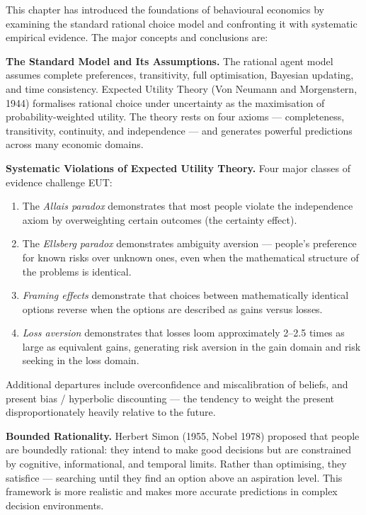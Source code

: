 \documentclass[12pt, letterpaper]{article}
\begin{document}
This chapter has introduced the foundations of behavioural economics by examining the standard rational choice model and confronting it with systematic empirical evidence. The major concepts and conclusions are:

\textbf{The Standard Model and Its Assumptions.} The rational agent model assumes complete preferences, transitivity, full optimisation, Bayesian updating, and time consistency. Expected Utility Theory (Von Neumann and Morgenstern, 1944) formalises rational choice under uncertainty as the maximisation of probability-weighted utility. The theory rests on four axioms --- completeness, transitivity, continuity, and independence --- and generates powerful predictions across many economic domains.

\textbf{Systematic Violations of Expected Utility Theory.} Four major classes of evidence challenge EUT:
\begin{enumerate}
\item The \textit{Allais paradox} demonstrates that most people violate the independence axiom by overweighting certain outcomes (the certainty effect).
\item The \textit{Ellsberg paradox} demonstrates ambiguity aversion --- people's preference for known risks over unknown ones, even when the mathematical structure of the problems is identical.
\item \textit{Framing effects} demonstrate that choices between mathematically identical options reverse when the options are described as gains versus losses.
\item \textit{Loss aversion} demonstrates that losses loom approximately 2--2.5 times as large as equivalent gains, generating risk aversion in the gain domain and risk seeking in the loss domain.
\end{enumerate}

Additional departures include overconfidence and miscalibration of beliefs, and present bias / hyperbolic discounting --- the tendency to weight the present disproportionately heavily relative to the future.

\textbf{Bounded Rationality.} Herbert Simon (1955, Nobel 1978) proposed that people are boundedly rational: they intend to make good decisions but are constrained by cognitive, informational, and temporal limits. Rather than optimising, they satisfice --- searching until they find an option above an aspiration level. This framework is more realistic and makes more accurate predictions in complex decision environments.
\end{document}
